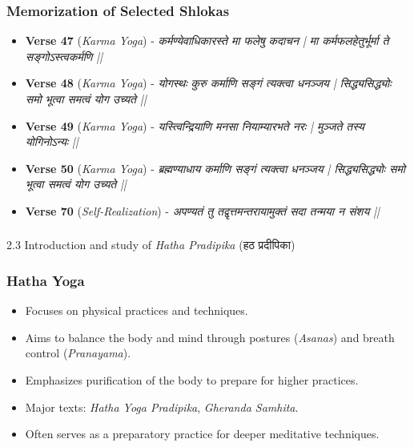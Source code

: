 \begin{frame}[fragile]\frametitle{Memorization of Selected Shlokas}

      \begin{itemize}
		\item \textbf{Verse 47} (\textit{Karma Yoga}) - \textit{कर्मण्येवाधिकारस्ते मा फलेषु कदाचन | मा कर्मफलहेतुर्भूर्मा ते सङ्गोऽस्त्वकर्मणि ||}
		\item \textbf{Verse 48} (\textit{Karma Yoga}) - \textit{योगस्थः कुरु कर्माणि सङ्गं त्यक्त्वा धनञ्जय | सिद्ध्यसिद्ध्योः समो भूत्वा समत्वं योग उच्यते ||}
		\item \textbf{Verse 49} (\textit{Karma Yoga}) - \textit{यस्त्विन्द्रियाणि मनसा नियाम्यारभते नरः | मुञ्जते तस्य योगिनोऽन्यः ||}
		\item \textbf{Verse 50} (\textit{Karma Yoga}) - \textit{ब्रह्मण्याधाय कर्माणि सङ्गं त्यक्त्वा धनञ्जय | सिद्ध्यसिद्ध्योः समो भूत्वा समत्वं योग उच्यते ||}
		\item \textbf{Verse 70} (\textit{Self-Realization}) - \textit{अपण्यतं तु तद्वृत्तमन्तरायामुक्तं सदा तन्मया न संशय ||}
	  \end{itemize}

\end{frame}

\begin{frame}[fragile]\frametitle{}
\begin{center}
{\Large 2.3 Introduction and study of \textit{Hatha Pradipika} (हठ प्रदीपिका)}
\end{center}
\end{frame}

\begin{frame}[fragile]\frametitle{Hatha Yoga}

      \begin{itemize}
		\item Focuses on physical practices and techniques.
		\item Aims to balance the body and mind through postures (\textit{Asanas}) and breath control (\textit{Pranayama}).
		\item Emphasizes purification of the body to prepare for higher practices.
		\item Major texts: \textit{Hatha Yoga Pradipika}, \textit{Gheranda Samhita}.
		\item Often serves as a preparatory practice for deeper meditative techniques.
	  \end{itemize}

\end{frame}

